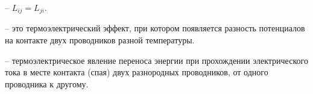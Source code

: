 \phantom{42}

 -- $L_{ij} = L_{ji}$.

 -- это термоэлектрический эффект, при котором появляется разность потенциалов на контакте двух проводников разной температуры.

 -- термоэлектрическое явление переноса энергии при прохождении электрического тока в месте контакта (спая) двух разнородных проводников, от одного проводника к другому.

